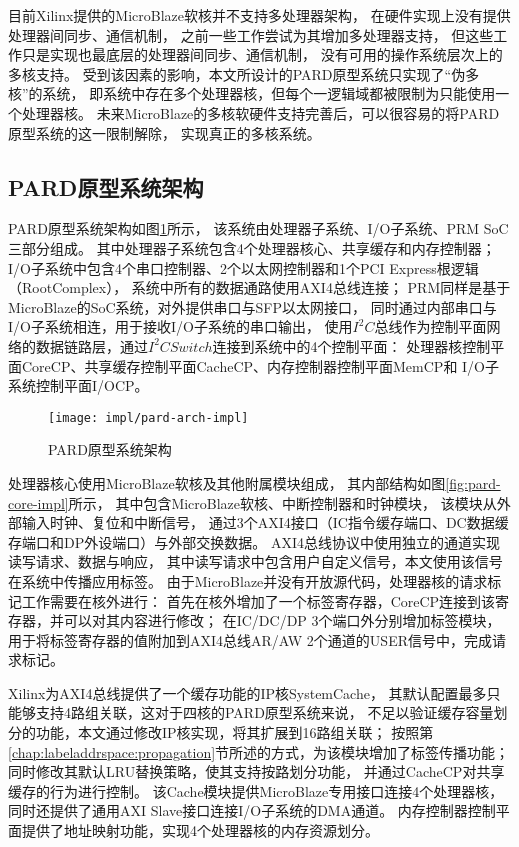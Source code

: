 目前Xilinx提供的MicroBlaze软核并不支持多处理器架构，
在硬件实现上没有提供处理器间同步、通信机制，
之前一些工作\cite{microblaze-mp-rsp08,microblaze-mp-xapp}尝试为其增加多处理器支持，
但这些工作只是实现也最底层的处理器间同步、通信机制，
没有可用的操作系统层次上的多核支持。
受到该因素的影响，本文所设计的PARD原型系统只实现了``伪多核''的系统，
即系统中存在多个处理器核，但每个一逻辑域都被限制为只能使用一个处理器核。
未来MicroBlaze的多核软硬件支持完善后，可以很容易的将PARD原型系统的这一限制解除，
实现真正的多核系统。


\subsection{PARD原型系统架构}

PARD原型系统架构如图\ref{fig:pard-arch-impl}所示，
该系统由处理器子系统、I/O子系统、PRM SoC三部分组成。
其中处理器子系统包含4个处理器核心、共享缓存和内存控制器；
I/O子系统中包含4个串口控制器、2个以太网控制器和1个PCI Express根逻辑（RootComplex），
系统中所有的数据通路使用AXI4总线连接；
PRM同样是基于MicroBlaze的SoC系统，对外提供串口与SFP以太网接口，
同时通过内部串口与I/O子系统相连，用于接收I/O子系统的串口输出，
使用$I^2C$总线作为控制平面网络的数据链路层，通过$I^2C Switch$连接到系统中的4个控制平面：
处理器核控制平面CoreCP、共享缓存控制平面CacheCP、内存控制器控制平面MemCP和
I/O子系统控制平面I/OCP。

\begin{figure}[tb]
  \centering
  \texttt{[image: impl/pard-arch-impl]}
  \caption{PARD原型系统架构}
  \label{fig:pard-arch-impl}
\end{figure}

处理器核心使用MicroBlaze软核及其他附属模块组成，
其内部结构如图\ref{fig:pard-core-impl}所示，
其中包含MicroBlaze软核、中断控制器和时钟模块，
该模块从外部输入时钟、复位和中断信号，
通过3个AXI4接口（IC指令缓存端口、DC数据缓存端口和DP外设端口）与外部交换数据。
AXI4总线协议中使用独立的通道实现读写请求、数据与响应，
其中读写请求中包含用户自定义信号，本文使用该信号在系统中传播应用标签。
由于MicroBlaze并没有开放源代码，处理器核的请求标记工作需要在核外进行：
首先在核外增加了一个标签寄存器，CoreCP连接到该寄存器，并可以对其内容进行修改；
在IC/DC/DP 3个端口外分别增加标签模块，
用于将标签寄存器的值附加到AXI4总线AR/AW 2个通道的USER信号中，完成请求标记。

Xilinx为AXI4总线提供了一个缓存功能的IP核SystemCache\cite{pg118-system-cache}，
其默认配置最多只能够支持4路组关联，这对于四核的PARD原型系统来说，
不足以验证缓存容量划分的功能，本文通过修改IP核实现，将其扩展到16路组关联；
按照第\ref{chap:labeladdrspace:propagation}节所述的方式，为该模块增加了标签传播功能；
同时修改其默认LRU替换策略，使其支持按路划分功能，
并通过CacheCP对共享缓存的行为进行控制。%
该Cache模块提供MicroBlaze专用接口连接4个处理器核，
同时还提供了通用AXI Slave接口连接I/O子系统的DMA通道。
内存控制器控制平面提供了地址映射功能，实现4个处理器核的内存资源划分。

